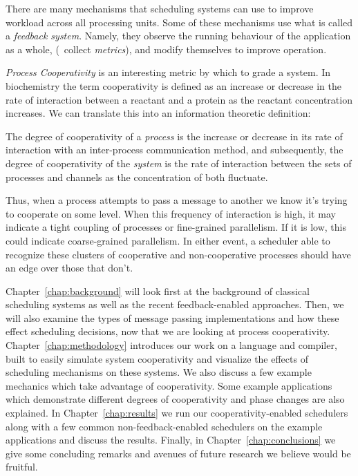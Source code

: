 There are many mechanisms that scheduling systems can use to improve workload 
across all processing units. Some of these 
mechanisms use what is called a {\em feedback system}. Namely, they observe the 
running behaviour of the application as a whole, (\ie~collect {\em metrics}),
and modify themselves to improve operation. 

{\em Process Cooperativity} is an interesting metric by which to grade a system. In
biochemistry the term cooperativity is defined as an increase or decrease
in the rate of interaction between a reactant and a protein as the reactant
concentration increases. We can translate this into an information theoretic 
definition: 
\begin{newdef}\label{def:degree of cooperativity}
    The degree of cooperativity of a {\em process} is the increase or decrease 
    in its rate of interaction with an inter-process communication method, and
    subsequently, the degree of cooperativity of the {\em system} is the rate of
    interaction between the sets of processes and channels as the concentration
    of both fluctuate.
\end{newdef}

Thus, when a process attempts to pass a message to another we know it's trying 
to cooperate on some level. When this frequency of interaction is high, it may
indicate a tight coupling of processes or fine-grained parallelism. If it is 
low, this could indicate coarse-grained parallelism. In either event, a 
scheduler able to recognize these clusters of cooperative and non-cooperative 
processes should have an edge over those that don't.

Chapter~\ref{chap:background} will look first at the background of classical 
scheduling systems as well as the recent feedback-enabled approaches. Then, we 
will also examine the types of message passing implementations and how these
effect scheduling decisions, now that we are looking at process cooperativity.
Chapter~\ref{chap:methodology} introduces our work on a language and compiler,
built to easily simulate system cooperativity and visualize the effects of 
scheduling mechanisms on these systems. We also discuss a few example mechanics
which take advantage of cooperativity. Some example applications which 
demonstrate different degrees of cooperativity and phase changes are also 
explained.
In Chapter~\ref{chap:results} we run our cooperativity-enabled schedulers along
with a few common non-feedback-enabled schedulers on the example applications
and discuss the results. 
Finally, in Chapter~\ref{chap:conclusions} we give some concluding remarks and
avenues of future research we believe would be fruitful.


